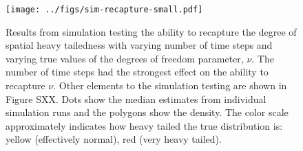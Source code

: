 \documentclass[12pt,english]{article}
\begin{document}
\begin{spacing}{1.25}
\clearpage

\begin{figure}[htb]
\begin{center}
  \texttt{[image: ../figs/sim-recapture-small.pdf]}
\caption{Results from simulation testing the ability to recapture the degree 
of spatial heavy tailedness with varying number of time steps and varying 
true values of the degrees of freedom parameter, $\nu$. The number of time steps 
had the strongest effect on the ability to recapture $\nu$. Other elements to
the simulation testing are shown in Figure SXX. Dots show the 
median estimates from individual simulation runs and the polygons 
show the density. The color scale approximately indicates how heavy tailed 
the true distribution is: yellow (effectively normal), red (very heavy tailed).
}
\label{fig:didactic}
\end{center}
\end{figure}

\clearpage



\end{spacing}
\end{document}
